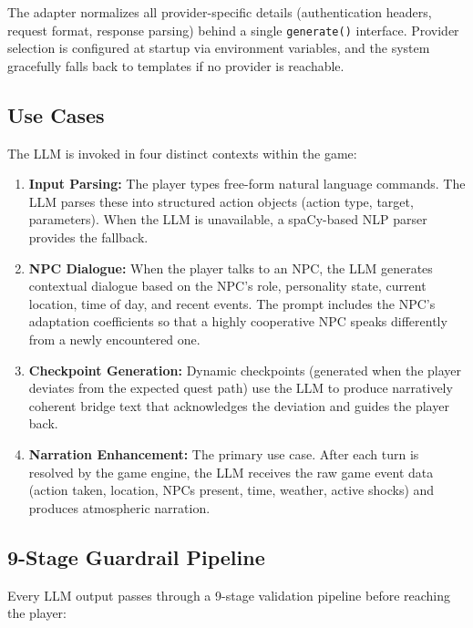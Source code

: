 \documentclass[12pt, a4paper, oneside]{report}
\begin{document}
The adapter normalizes all provider-specific details (authentication headers, request format, response parsing) behind a single \texttt{generate()} interface. Provider selection is configured at startup via environment variables, and the system gracefully falls back to templates if no provider is reachable.

\subsection{Use Cases}

The LLM is invoked in four distinct contexts within the game:

\begin{enumerate}[nosep]
    \item \textbf{Input Parsing:} The player types free-form natural language commands. The LLM parses these into structured action objects (action type, target, parameters). When the LLM is unavailable, a spaCy-based NLP parser provides the fallback.
    \item \textbf{NPC Dialogue:} When the player talks to an NPC, the LLM generates contextual dialogue based on the NPC's role, personality state, current location, time of day, and recent events. The prompt includes the NPC's adaptation coefficients so that a highly cooperative NPC speaks differently from a newly encountered one.
    \item \textbf{Checkpoint Generation:} Dynamic checkpoints (generated when the player deviates from the expected quest path) use the LLM to produce narratively coherent bridge text that acknowledges the deviation and guides the player back.
    \item \textbf{Narration Enhancement:} The primary use case. After each turn is resolved by the game engine, the LLM receives the raw game event data (action taken, location, NPCs present, time, weather, active shocks) and produces atmospheric narration.
\end{enumerate}

\subsection{9-Stage Guardrail Pipeline}

Every LLM output passes through a 9-stage validation pipeline before reaching the player:
\end{document}

